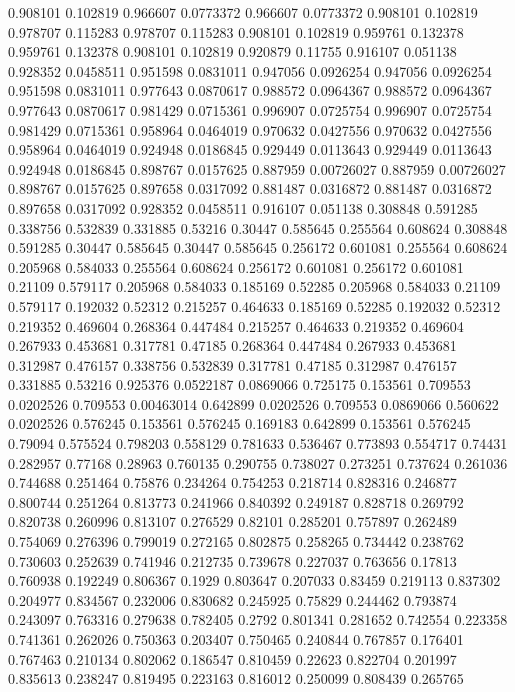 0.908101 0.102819
0.966607 0.0773372
0.966607 0.0773372
0.908101 0.102819
0.978707 0.115283
0.978707 0.115283
0.908101 0.102819
0.959761 0.132378
0.959761 0.132378
0.908101 0.102819
0.920879 0.11755
0.916107 0.051138
0.928352 0.0458511
0.951598 0.0831011
0.947056 0.0926254
0.947056 0.0926254
0.951598 0.0831011
0.977643 0.0870617
0.988572 0.0964367
0.988572 0.0964367
0.977643 0.0870617
0.981429 0.0715361
0.996907 0.0725754
0.996907 0.0725754
0.981429 0.0715361
0.958964 0.0464019
0.970632 0.0427556
0.970632 0.0427556
0.958964 0.0464019
0.924948 0.0186845
0.929449 0.0113643
0.929449 0.0113643
0.924948 0.0186845
0.898767 0.0157625
0.887959 0.00726027
0.887959 0.00726027
0.898767 0.0157625
0.897658 0.0317092
0.881487 0.0316872
0.881487 0.0316872
0.897658 0.0317092
0.928352 0.0458511
0.916107 0.051138
0.308848 0.591285
0.338756 0.532839
0.331885 0.53216
0.30447 0.585645
0.255564 0.608624
0.308848 0.591285
0.30447 0.585645
0.30447 0.585645
0.256172 0.601081
0.255564 0.608624
0.205968 0.584033
0.255564 0.608624
0.256172 0.601081
0.256172 0.601081
0.21109 0.579117
0.205968 0.584033
0.185169 0.52285
0.205968 0.584033
0.21109 0.579117
0.192032 0.52312
0.215257 0.464633
0.185169 0.52285
0.192032 0.52312
0.219352 0.469604
0.268364 0.447484
0.215257 0.464633
0.219352 0.469604
0.267933 0.453681
0.317781 0.47185
0.268364 0.447484
0.267933 0.453681
0.312987 0.476157
0.338756 0.532839
0.317781 0.47185
0.312987 0.476157
0.331885 0.53216
0.925376 0.0522187
0.0869066 0.725175
0.153561 0.709553
0.0202526 0.709553
0.00463014 0.642899
0.0202526 0.709553
0.0869066 0.560622
0.0202526 0.576245
0.153561 0.576245
0.169183 0.642899
0.153561 0.576245
0.79094 0.575524
0.798203 0.558129
0.781633 0.536467
0.773893 0.554717
0.74431 0.282957
0.77168 0.28963
0.760135 0.290755
0.738027 0.273251
0.737624 0.261036
0.744688 0.251464
0.75876 0.234264
0.754253 0.218714
0.828316 0.246877
0.800744 0.251264
0.813773 0.241966
0.840392 0.249187
0.828718 0.269792
0.820738 0.260996
0.813107 0.276529
0.82101 0.285201
0.757897 0.262489
0.754069 0.276396
0.799019 0.272165
0.802875 0.258265
0.734442 0.238762
0.730603 0.252639
0.741946 0.212735
0.739678 0.227037
0.763656 0.17813
0.760938 0.192249
0.806367 0.1929
0.803647 0.207033
0.83459 0.219113
0.837302 0.204977
0.834567 0.232006
0.830682 0.245925
0.75829 0.244462
0.793874 0.243097
0.763316 0.279638
0.782405 0.2792
0.801341 0.281652
0.742554 0.223358
0.741361 0.262026
0.750363 0.203407
0.750465 0.240844
0.767857 0.176401
0.767463 0.210134
0.802062 0.186547
0.810459 0.22623
0.822704 0.201997
0.835613 0.238247
0.819495 0.223163
0.816012 0.250099
0.808439 0.265765
